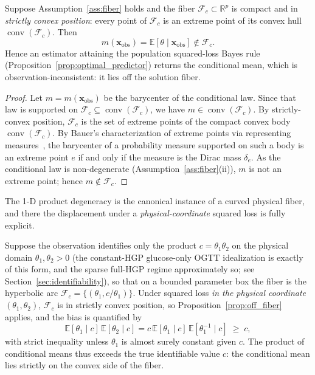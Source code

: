\begin{proposition}
\label{prop:off_fiber}
Suppose Assumption~\ref{ass:fiber} holds and the fiber $\mathcal{F}_c\subset\mathbb{R}^p$ is compact and in \emph{strictly convex position}: every point of $\mathcal{F}_c$ is an extreme point of its convex hull $\operatorname{conv}(\mathcal{F}_c)$. Then
\[
m(\mathbf{x}_\mathrm{obs})=\mathbb{E}[\theta\mid\mathbf{x}_\mathrm{obs}]\notin\mathcal{F}_c .
\]
Hence an estimator attaining the population squared-loss Bayes rule (Proposition~\ref{prop:optimal_predictor}) returns the conditional mean, which is observation-inconsistent: it lies off the solution fiber.
\end{proposition}

\begin{proof}
Let $m=m(\mathbf{x}_\mathrm{obs})$ be the barycenter of the conditional law. Since that law is supported on $\mathcal{F}_c\subseteq\operatorname{conv}(\mathcal{F}_c)$, we have $m\in\operatorname{conv}(\mathcal{F}_c)$. By strictly-convex position, $\mathcal{F}_c$ is the set of extreme points of the compact convex body $\operatorname{conv}(\mathcal{F}_c)$. By Bauer's characterization of extreme points via representing measures~\cite{phelps2001choquet}, the barycenter of a probability measure supported on such a body is an extreme point $e$ if and only if the measure is the Dirac mass $\delta_e$. As the conditional law is non-degenerate (Assumption~\ref{ass:fiber}(ii)), $m$ is not an extreme point; hence $m\notin\mathcal{F}_c$.
\end{proof}

The 1-D product degeneracy is the canonical instance of a curved physical fiber, and there the displacement under a \emph{physical-coordinate} squared loss is fully explicit.

\begin{corollary}
\label{cor:off_fiber_product}
Suppose the observation identifies only the product $c=\theta_1\theta_2$ on the physical domain $\theta_1,\theta_2>0$ (the constant-HGP glucose-only OGTT idealization is exactly of this form, and the sparse full-HGP regime approximately so; see Section~\ref{sec:identifiability}), so that on a bounded parameter box the fiber is the hyperbolic arc $\mathcal{F}_c=\{(\theta_1,c/\theta_1)\}$. Under squared loss \emph{in the physical coordinate} $(\theta_1,\theta_2)$, $\mathcal{F}_c$ is in strictly convex position, so Proposition~\ref{prop:off_fiber} applies, and the bias is quantified by
\[
\mathbb{E}[\theta_1\mid c]\,\mathbb{E}[\theta_2\mid c]
= c\,\mathbb{E}[\theta_1\mid c]\,\mathbb{E}[\theta_1^{-1}\mid c]
\;\ge\; c,
\]
with strict inequality unless $\theta_1$ is almost surely constant given $c$. The product of conditional means thus exceeds the true identifiable value $c$: the conditional mean lies strictly on the convex side of the fiber.
\end{corollary}

